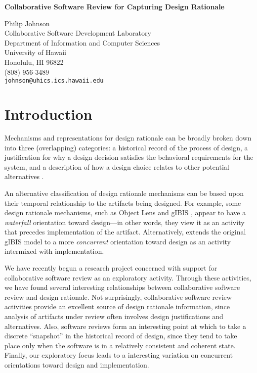 
%


\begin{center}

{\Large\bf Collaborative Software Review for Capturing Design Rationale} \bigskip

Philip Johnson\\
Collaborative Software Development Laboratory\\
Department of Information and Computer Sciences\\ 
University of Hawaii\\ 
Honolulu, HI 96822\\
(808) 956-3489\\
{\tt johnson@uhics.ics.hawaii.edu}
\end{center}

\section{Introduction}

Mechanisms and representations for design rationale can be broadly
broken down into three (overlapping) categories: a historical record
of the process of design, a justification for why a design decision
satisfies the behavioral requirements for the system, and a
description of how a design choice relates to other potential
alternatives \cite{Lee91}.

An alternative classification of design rationale mechanisms can be 
based upon their temporal relationship to the artifacts being
designed.  For example, some design rationale mechanisms, such as
Object Lens \cite{Lai88Object} and gIBIS \cite{Conklin88Gibis}, appear to have a
{\em waterfall} orientation toward design---in other words, they view
it as an activity that precedes implementation of the artifact.
Alternatively, \cite{Potts88} extends the original gIBIS model to a
more {\em concurrent} orientation toward design as an activity
intermixed with implementation.

We have recently begun a research project concerned with support for
collaborative software review as an exploratory activity.  Through
these activities, we have found several interesting relationships
between collaborative software review and design rationale.  Not
surprisingly, collaborative software review activities provide an
excellent source of design rationale information, since analysis of
artifacts under review often involves design justifications and
alternatives.  Also, software reviews form an interesting point
at which to take a discrete ``snapshot'' in the historical record of
design, since they tend to take place only when the software is in a
relatively consistent and coherent state.  Finally, our exploratory
focus leads to a interesting variation on concurrent orientations
toward design and implementation.

